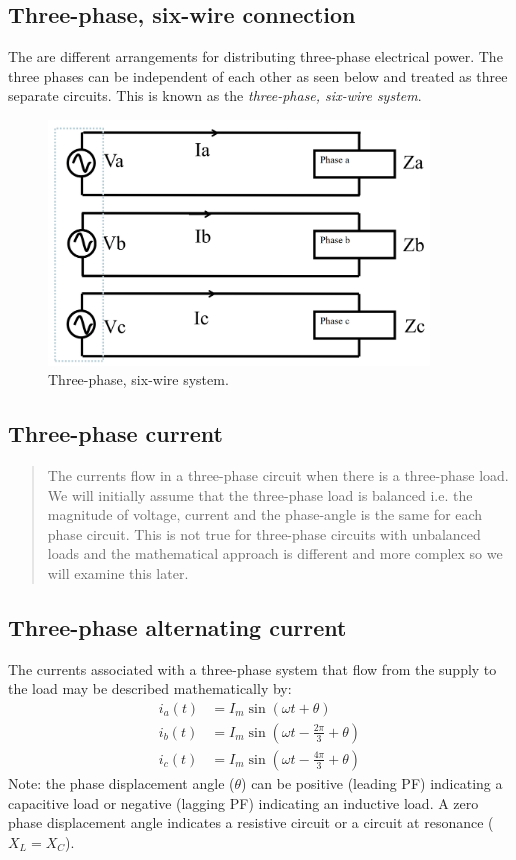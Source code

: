 \documentclass[class=report, crop=false, 12pt,a4paper]{standalone}
\begin{document}
\subsection{Three-phase, six-wire connection}
The are different arrangements for distributing three-phase electrical power. The three phases can be independent of each other as seen below and treated as three separate circuits. This is known as the \textit{three-phase, six-wire system}.
\begin{figure}[H]
	\centering
	\includegraphics[width = 0.9\textwidth]{../img/figure6.png}
	\caption{Three-phase, six-wire system.}
\end{figure}
\subsection{Three-phase current}
\begin{quote}
	The currents flow in a three-phase circuit when there is a three-phase load. We will initially assume that the three-phase load is balanced i.e. the magnitude of voltage, current and the phase-angle is the same for each phase circuit. This is not true for three-phase circuits with unbalanced loads and the mathematical approach is different and more complex so we will examine this later.
\end{quote}
\subsection{Three-phase alternating current}
The currents associated with a three-phase system that flow from the supply to the load may be described mathematically by:
\begin{align}
	i_a \left(t\right) & = I_m \sin \left( \omega t + \theta \right)                \\
	i_b \left(t\right) & = I_m \sin \left( \omega t - \frac{2\pi}{3} +\theta\right) \\
	i_c \left(t\right) & = I_m \sin \left( \omega t - \frac{4\pi}{3} +\theta\right)
\end{align}
Note: the phase displacement angle ($\theta$) can be positive (leading PF) indicating a capacitive load or negative (lagging PF) indicating an inductive load. A zero phase displacement angle indicates a resistive circuit or a circuit at resonance ($X_L = X_C$).
\end{document}
